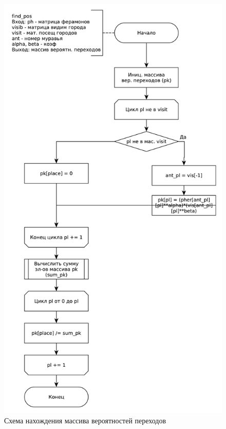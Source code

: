 \begin{figure}[ht!]
	\centering
	\includegraphics[width=0.8\linewidth]{assets/graphs/find_pos.pdf}
	\caption{Схема нахождения массива вероятностей переходов}
	\label{fig:find_pos}
\end{figure}

